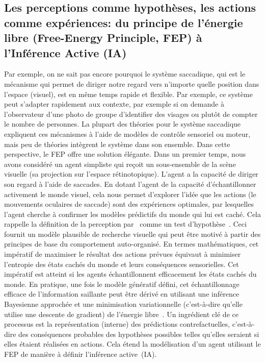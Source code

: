 \documentclass[11pt,french,a4paper,oneside]{article}%
\begin{document}
\subsection{Les perceptions comme hypothèses, les actions comme expériences: du principe de
l'énergie libre (Free-Energy Principle, FEP) à l'Inférence Active (IA)}
Par exemple, on ne sait pas encore pourquoi le système saccadique, qui est le mécanisme qui
permet de diriger notre regard vers n'importe quelle position dans l'espace
(visuel), est en même temps rapide et flexible. Par
exemple, ce système peut s'adapter rapidement aux contexte,
par exemple si on demande à l'observateur d'une photo de groupe d'identifier des visages ou plutôt de compter le nombre de personnes. La plupart des théories pour le système saccadique expliquent ces mécanismes à l'aide de
modèles de contrôle sensoriel ou moteur, mais peu de théories intègrent
le système dans son ensemble. Dans cette perspective, le FEP offre une
solution élégante. Dans un premier temps, nous avons considéré un agent
simpliste qui reçoit un sous-ensemble de la scène visuelle (sa
projection sur l'espace rétinotopique). L'agent a la capacité de diriger
son regard à l'aide de saccades. En dotant l'agent de la capacité
d'échantillonner activement le monde visuel, cela nous permet d'explorer
l'idée que les actions (le mouvements oculaires de saccade) sont des
expériences optimales, par lesquelles l'agent cherche à confirmer les
modèles prédictifs du monde qui lui est caché. Cela rappelle la définition de la
perception par~\citet{vonHelmholtz1867} comme un test d'hypothèse~\citep{Gregory80}. Ceci fournit un modèle plausible de recherche visuelle
qui peut être motivé à partir des principes de base du comportement
auto-organisé. En termes mathématiques, cet impératif de maximiser le
résultat des actions prévues équivaut à minimiser l'entropie des états
cachés du monde et leurs conséquences sensorielles. Cet impératif est
atteint si les agents échantillonnent efficacement les états cachés du
monde. En pratique, une fois le modèle génératif défini, cet
échantillonnage efficace de l'information saillante peut être dérivé en
utilisant une inférence Bayesienne approchée et une minimisation
variationnelle (c'est-à-dire qu'elle utilise une descente de gradient) de l'énergie libre~\citep{Friston10}. Un ingrédient clé
de ce processus est la représentation (interne) des prédictions
contrefactuelles, c'est-à-dire des conséquences probables des hypothèses
possibles telles qu'elles seraient si elles étaient réalisées en actions.
Cela étend
la modélisation d'un agent utilisant le FEP de manière à définir l'inférence
active~(IA).
\end{document}
